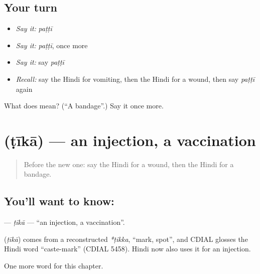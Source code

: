 \subsection*{Your turn}
\begin{itemize}
\raggedright
  \item \emph{Say it:} \emph{paṭṭī}
  \item \emph{Say it:} \emph{paṭṭī}, once more
  \item \emph{Say it:} say \emph{paṭṭī}
  \item \emph{Recall:} say the Hindi for vomiting, then the Hindi for a wound, then say \emph{paṭṭī} again
\end{itemize}

\begin{tcolorbox}[breakable,colback=teal!4,colframe=teal!35!black,title={Before you move on}]
What does  mean? (\textquotedblleft{}A bandage\textquotedblright{}.) Say it once more.
\end{tcolorbox}
\section[\texorpdfstring{\hi{टीका} (ṭīkā)}{टीका (ṭīkā)}]{ (ṭīkā) — an injection, a vaccination}

\label{lesson:HI-C256-tika}



\begin{quote}
Before the new one: say the Hindi for a wound, then the Hindi for a bandage.
\end{quote}

\subsection*{You'll want to know: }
\textbf{} — \emph{ṭīkā} — \textquotedblleft{}an injection, a vaccination\textquotedblright{}.

\begin{cousinweb}
\textbf{} (\emph{ṭīkā}) comes from a reconstructed \emph{*ṭikka}, \textquotedblleft{}mark, spot\textquotedblright{}, and CDIAL glosses the Hindi word \textquotedblleft{}caste-mark\textquotedblright{} (CDIAL 5458). Hindi now also uses it for an injection.
\end{cousinweb}

\begin{grammarlens}[title={What you've built}]
One more word for this chapter.
\end{grammarlens}

